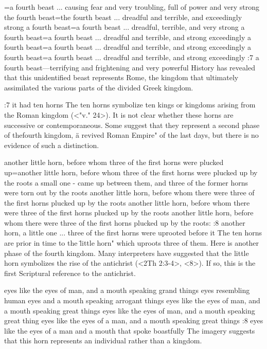 ={a fourth beast ... causing fear and very troubling, full of power and very strong} %
    {the fourth beast}={the fourth beast ... dreadful and terrible, and exceedingly strong} %
    {a fourth beast}={a fourth beast ... dreadful, terrible, and very strong} %
    {a fourth beast}={a fourth beast ... dreadful and terrible, and strong exceedingly} %
    {a fourth beast}={a fourth beast ... dreadful and terrible, and strong exceedingly} %
    {a fourth beast}={a fourth beast ... dreadful and terrible, and strong exceedingly} %
:7 {a fourth beast—terrifying and frightening and very powerful}
History has revealed that this
unidentified beast represents  Rome, the kingdom that ultimately assimilated the various parts of 
the divided Greek kingdom.

:7 {it had ten horns} The ten horns symbolize ten kings or kingdoms arising
from the Roman kingdom (<"v."  24>). It is not clear whether these horns are successive or
contemporaneous. Some suggest that they represent a second phase of  
thefourth kingdom, \"a revived Roman Empire" of the last days, but 
there is no evidence of such a distinction.

    {another little horn, before whom three of the first horns were plucked up}={another little horn, before whom three of the first horns were plucked up by the roots} %
    {a small one - came up between them, and three of the former horns were torn out by the roots} %
    {another little horn, before whom there were three of the first horns plucked up by the roots} %
    {another little horn, before whom there were three of the first horns plucked up by the roots} %
    {another little horn, before whom there were three of the first horns plucked up by the roots:} %
:8 {another horn, a little one ... three of the first horns were 
uprooted before it} The ten horns are prior in time to the \"little horn" which uproots three of them. Here is another phase of the 
fourth kingdom. Many interpreters have suggested that the little 
horn symbolizes the rise of the antichrist (<2Th 2:3-4>, <8>). If so, this is 
the first Scriptural reference to the antichrist.

    {eyes like the eyes of man, and a mouth speaking grand things} %
    {eyes resembling human eyes and a mouth speaking arrogant things} %
    {eyes like the eyes of man, and a mouth speaking great things} %
    {eyes like the eyes of man, and a mouth speaking great thing} %
    {eyes like the eyes of a man, and a mouth speaking great things} %
:8 {eyes like the eyes of a man and a mouth that spoke boastfully} The imagery suggests 
that this horn represents an individual rather than a kingdom. 

